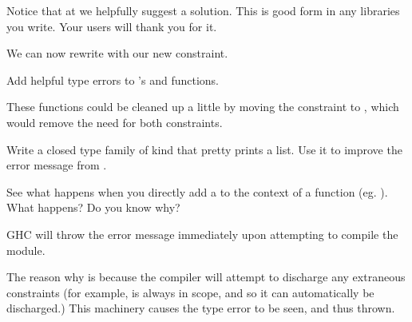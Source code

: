 \documentclass[book.tex]{subfiles}
\begin{document}
Notice that at  we helpfully suggest a solution. This is good form in
any libraries you write. Your users will thank you for it.

We can now rewrite  with our new constraint.


\begin{exercise}
Add helpful type errors to 's  and
 functions.
\end{exercise}
\begin{solution}

These functions could be cleaned up a little by moving the 
  constraint to , which would remove the need for both constraints.
\end{solution}

\begin{exercise}
Write a closed type family of kind  that
pretty prints a list. Use it to improve the error message from
.
\end{exercise}
\begin{solution}
\end{solution}

\begin{exercise}
See what happens when you directly add a  to the context
of a function (eg. ). What happens? Do you know
why?
\end{exercise}
\begin{solution}
GHC will throw the error message immediately upon attempting to compile the
  module.

The reason why is because the compiler will attempt to discharge any extraneous
  constraints (for example,  is always in scope, and so it can
  automatically be discharged.) This machinery causes the type error to be seen,
  and thus thrown.
\end{solution}
\end{document}

